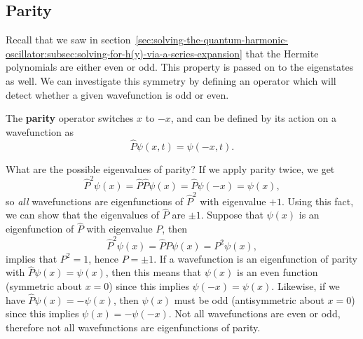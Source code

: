 \documentclass[../quantum_mechanics.tex]{subfiles}
\begin{document}
        \subsection{Parity}\label{sec:energy-eigenstates:subsec:parity}
            Recall that we saw in section~\ref{sec:solving-the-quantum-harmonic-oscillator:subsec:solving-for-h(y)-via-a-series-expansion} that the Hermite polynomials are either even or odd.
            This property is passed on to the eigenstates as well.
            We can investigate this symmetry by defining an operator which will detect whether a given wavefunction is odd or even.
            
            \begin{definition}
                The \textbf{parity} operator switches $x$ to $-x$, and can be defined by its action on a wavefunction as
                \begin{equation}
                    \hat{P}\psi(x,t)=\psi(-x,t).
                \end{equation}
            \end{definition}

            What are the possible eigenvalues of parity?
            If we apply parity twice, we get
            \begin{equation}
                \hat{P}^2\psi(x)=\hat{P}\hat{P}\psi(x)=\hat{P}\psi(-x)=\psi(x),
            \end{equation}
            so \textit{all} wavefunctions are eigenfunctions of $\hat{P}^2$ with eigenvalue $+1$.
            Using this fact, we can show that the eigenvalues of $\hat{P}$ are $\pm 1$.
            Suppose that $\psi(x)$ is an eigenfunction of $\hat{P}$ with eigenvalue $P$, then
            \begin{equation}
                \hat{P}^2\psi(x)=\hat{P}P\psi(x)=P^2\psi(x),
            \end{equation}
            implies that $P^2=1$, hence $P=\pm 1$.
            If a wavefunction is an eigenfunction of parity with $\hat{P}\psi(x)=\psi(x)$, then this means that $\psi(x)$ is an even function (symmetric about $x=0$) since this implies $\psi(-x)=\psi(x)$.
            Likewise, if we have $\hat{P}\psi(x)=-\psi(x)$, then $\psi(x)$ must be odd (antisymmetric about $x=0$) since this implies $\psi(x)=-\psi(-x)$.
            Not all wavefunctions are even or odd, therefore not all wavefunctions are eigenfunctions of parity.
\end{document}
